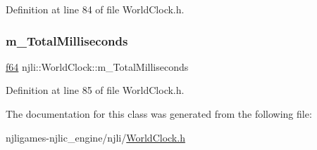 Definition at line 84 of file World\+Clock.\+h.

\mbox{\label{classnjli_1_1_world_clock_a2fccbd5a2216651b2614cf5b0d960046}} 
\subsubsection{\texorpdfstring{m\+\_\+\+Total\+Milliseconds}{m\_TotalMilliseconds}}
{\footnotesize\ttfamily \mbox{\hyperlink{_util_8h_a94dab5770726ccbef8c7d026cfbdf8e5}{f64}} njli\+::\+World\+Clock\+::m\+\_\+\+Total\+Milliseconds\hspace{0.3cm}{\ttfamily [private]}}



Definition at line 85 of file World\+Clock.\+h.



The documentation for this class was generated from the following file\+:\begin{DoxyCompactItemize}
\item 
njligames-\/njlic\+\_\+engine/njli/\mbox{\hyperlink{_world_clock_8h}{World\+Clock.\+h}}\end{DoxyCompactItemize}
